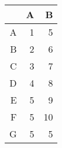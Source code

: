 \begin{table}[ht]
\begin{center}
\begin{tabular}{rrr}
  \hline
 & A & B \\
  \hline
A &   1 &   5 \\
  B &   2 &   6 \\
  C &   3 &   7 \\
  D &   4 &   8 \\
  E &   5 &   9 \\
  F &   5 &  10 \\
  G &   5 &   5 \\
   \hline
\end{tabular}
\end{center}
\end{table}
